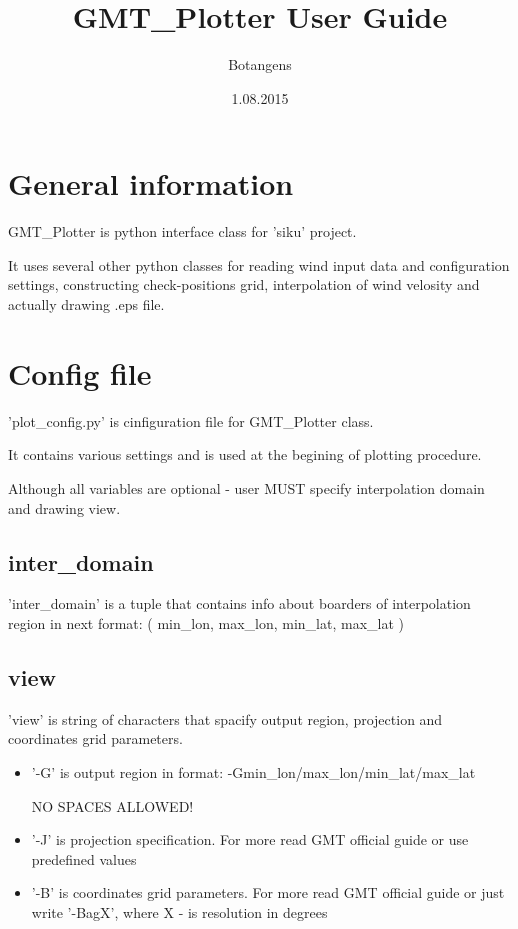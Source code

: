 \documentclass[a4paper,10pt]{article}
\title{GMT\_Plotter User Guide}
\author{Botangens}
\date{1.08.2015}
\begin{document}
\maketitle



\section{General information}

GMT\_Plotter is python interface class for 'siku' project.

It uses several other python classes for reading wind input
data and configuration settings, constructing check-positions 
grid, interpolation of wind velosity and actually drawing .eps file.


\section{Config file}

'plot\_config.py' is cinfiguration file for GMT\_Plotter class.

It contains various settings and is used at the begining of plotting procedure.


Although all variables are optional - user MUST specify interpolation domain
and drawing view.

\subsection{inter\_domain}

'inter\_domain' is a tuple that contains info about boarders 
of interpolation region in next format:
( min\_lon, max\_lon, min\_lat, max\_lat )

\subsection{view}

'view' is string of characters that spacify output region, projection 
and coordinates grid parameters.

\begin{itemize}
 \item '-G' is output region in format:
 -Gmin\_lon/max\_lon/min\_lat/max\_lat
 
 NO SPACES ALLOWED!
 
 \item '-J' is projection specification. For more read GMT official 
 guide or use predefined values
 
 \item '-B' is coordinates grid parameters. For more read GMT official 
 guide or just write '-BagX', where X - is resolution in degrees
\end{itemize}
\end{document}
